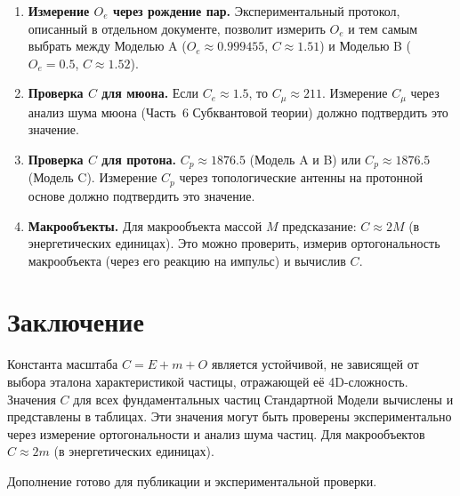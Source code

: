 \documentclass[12pt,a4paper]{article}
\begin{document}
\begin{enumerate}[label=\arabic*.]
    \item \textbf{Измерение $O_e$ через рождение пар.} Экспериментальный протокол, описанный в отдельном документе, позволит измерить $O_e$ и тем самым выбрать между Моделью A ($O_e \approx 0.999455$, $C \approx 1.51$) и Моделью B ($O_e = 0.5$, $C \approx 1.52$).
    \item \textbf{Проверка $C$ для мюона.} Если $C_e \approx 1.5$, то $C_\mu \approx 211$. Измерение $C_\mu$ через анализ шума мюона (Часть~6 Субквантовой теории) должно подтвердить это значение.
    \item \textbf{Проверка $C$ для протона.} $C_p \approx 1876.5$ (Модель A и B) или $C_p \approx 1876.5$ (Модель C). Измерение $C_p$ через топологические антенны на протонной основе должно подтвердить это значение.
    \item \textbf{Макрообъекты.} Для макрообъекта массой $M$ предсказание: $C \approx 2M$ (в энергетических единицах). Это можно проверить, измерив ортогональность макрообъекта (через его реакцию на импульс) и вычислив $C$.
\end{enumerate}

\section{Заключение}

Константа масштаба $C = E + m + O$ является устойчивой, не зависящей от выбора эталона характеристикой частицы, отражающей её 4D-сложность. Значения $C$ для всех фундаментальных частиц Стандартной Модели вычислены и представлены в таблицах. Эти значения могут быть проверены экспериментально через измерение ортогональности и анализ шума частиц. Для макрообъектов $C \approx 2m$ (в энергетических единицах).

Дополнение готово для публикации и экспериментальной проверки.
\end{document}
